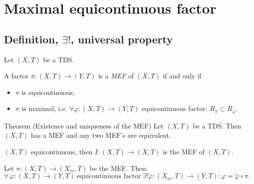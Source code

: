 \section{Maximal equicontinuous factor}
\subsection{Definition, $\exists!$, universal property}
\begin{frame}
  Let $(X,T)$ be a TDS.
  \begin{definition}
    A factor $\pi : (X,T) \to (Y,T)$ is a \emph{MEF} of $(X,T)$ if and only if
  \begin{itemize}
    \item $\pi$ is equicontinuous,
    \item $\pi$ is maximal, i.e. $\forall \varphi : (X,T) \to (Y,T)$ equicontinuous factor: $R_\pi \subset R_\varphi$.
  \end{itemize}
\end{definition}
\pause
  \begin{alertblock}{Theorem (Existence and uniqueness of the MEF)}
  Let $(X,T)$ be a TDS.
  Then $(X,T)$ has a MEF and any two MEF's are equivalent.
  \end{alertblock}
  \pause
\begin{example}
  $(X,T)$ equicontinuous, then $I: (X,T) \to (X,T)$ is the MEF of $(X,T)$.
\end{example}

\end{frame}
\begin{frame}[fragile]
\begin{proposition}
  Let $\pi : (X, T) \to  (X_m,T)$ be the MEF.
  Then:
  \begin{equation*}
    \forall \, \varphi : (X,T) \to (Y,T) \ \text{equicontinuous factor} \ \exists!\tilde{\varphi}: (X_m,T) \to (Y,T): \varphi = \tilde{\varphi} \circ \pi.
  \end{equation*}
  \end{proposition}
  \begin{center}
  \end{center}
\end{frame}
